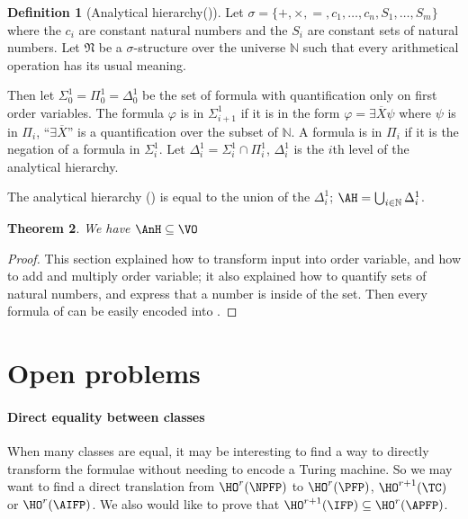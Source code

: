\documentclass[a4paper,12pt]{article}
\newtheorem{theorem}{Theorem}[section]
\theoremstyle{definition}
\newtheorem{definition}[theorem]{Definition}
\renewcommand{\phi}{\varphi}
\newcommand{\hoa}[1]{\ensuremath{\HO^{#1}}}
\newcommand{\mf}{\mathfrak}
\newcommand{\ol}{\overline}
\begin{document}
\begin{definition}[Analytical hierarchy(\AnH)]
  Let $\sigma=\{+,\times,=,c_1,\dots,c_n,S_{1},\dots, S_{m}\}$ where
  the $c_i$ are constant natural numbers and the $S_{i}$ are constant
  sets of natural numbers. Let $\mf N$ be a $\sigma$-structure over the
  universe $\mathbb N$ such that every arithmetical operation has
  its usual meaning.

  Then let $\Sigma^{1}_0=\Pi^{1}_0=\Delta_{0}^{1}$ be the set of
  formula with quantification only on first order variables. The
  formula $\phi$ is in $\Sigma^{1}_{i+1}$ if it is in the form
  $\phi=\exists \ol X\psi$ where $\psi$ is in $\Pi_{i}$, ``$\exists
  \ol X$'' is a quantification over the subset of $\mathbb N$.  A
  formula is in $\Pi_i$ if it is the negation of a formula in
  $\Sigma^{1}_i$. Let $\Delta^{1}_i=\Sigma^{1}_i\cap\Pi^{1}_i$,
  $\Delta^{1}_i$ is the $i$th level of the analytical hierarchy.

  The analytical hierarchy (\AnH) is equal to the union of the
  $\Delta^{1}_i$; $\AH=\bigcup_{i\in\mathbb N}\Delta^{1}_i$.
\end{definition}




\begin{theorem}
We have
$\AnH\subseteq\VO$\end{theorem}\label{anhvo}
\begin{proof}This section explained how to transform input into order
  variable, and how to add and multiply order variable; it also
  explained how to quantify sets of natural numbers, and express that
  a number is inside of the set.  Then every formula of \AnH{} can be
  easily encoded into \VO.







\end{proof}
\section{Open problems}\label{open}

\paragraph{Direct equality between classes}
When many classes are equal, it may be interesting to find a way to
directly transform the formulae without needing to encode a Turing
machine. So we may want to find a direct translation from $\hoa
r(\NPFP)$ to $\hoa r(\PFP)$, $\hoa{r+1}(\TC)$ or $\hoa r(\AIFP)$. We
also would like to prove that $\hoa {r+1}(\IFP)\subseteq\hoa
r(\APFP)$.
\end{document}
